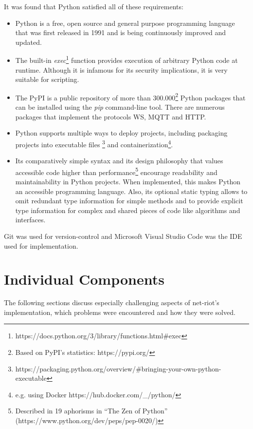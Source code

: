 It was found that Python satisfied all of these requirements:
\begin{itemize}
    \item Python is a free, open source and general purpose programming language that was first released in 1991 and is being continuously improved and updated. %
    \item The built-in \emph{exec}\footnote{https://docs.python.org/3/library/functions.html\#exec} function provides execution of arbitrary Python code at runtime. Although it is infamous for its security implications, it is very suitable for scripting.
    \item The \ac{PyPI} is a public repository of more than 300.000\footnote{Based on \ac{PyPI}'s statistics: https://pypi.org/} Python packages that can be installed using the \emph{pip} command-line tool. There are numerous packages that implement the protocols \ac{WS}, \ac{MQTT} and \ac{HTTP}.
    \item Python supports multiple ways to deploy projects, including packaging projects into executable files \footnote{https://packaging.python.org/overview/\#bringing-your-own-python-executable} and containerization\footnote{e.g. using Docker https://hub.docker.com/\_/python/}.
    \item Its comparatively simple syntax and its design philosophy that values accessible code higher than performance\footnote{Described in 19 aphorisms in \enquote{The Zen of Python} (https://www.python.org/dev/peps/pep-0020/)} encourage readability and maintainability in Python projects. When implemented, this makes Python an accessible programming language. Also, its optional static typing allows to omit redundant type information for simple methods and to provide explicit type information for complex and shared pieces of code like algorithms and interfaces.
\end{itemize} %
Git was used for version-control and Microsoft Visual Studio Code was the \ac{IDE} used for implementation.


\section{Individual Components}
\label{sec:individual-components}
The following sections discuss especially challenging aspects of net-riot's implementation, which problems were encountered and how they were solved.

